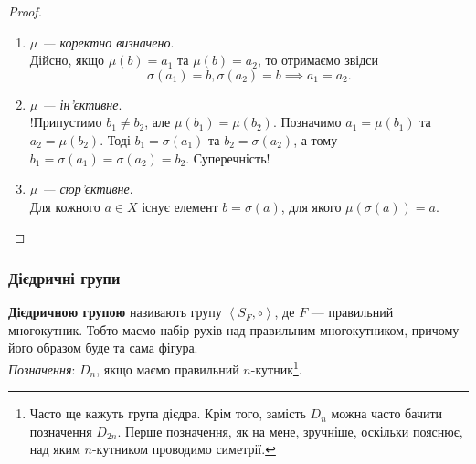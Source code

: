 \documentclass{math_library}
\begin{document}
\begin{proof}
\begin{enumerate}[topsep=0pt,label={\Roman*.},wide=0pt]
\item \textit{$\mu$ --- коректно визначено}.\\
Дійсно, якщо $\mu(b) = a_1$ та $\mu(b) = a_2$, то отримаємо звідси \[
\sigma(a_1) = b, \sigma(a_2) = b \implies a_1 = a_2.
\]

\item \textit{$\mu$ --- ін'єктивне}.\\
!Припустимо $b_1 \neq b_2$, але $\mu(b_1) = \mu(b_2)$. Позначимо $a_1 = \mu(b_1)$ та $a_2 = \mu(b_2)$. Тоді $b_1 = \sigma(a_1)$ та $b_2 = \sigma(a_2)$, а тому $b_1 = \sigma(a_1) = \sigma(a_2) = b_2$. Суперечність!

\item \textit{$\mu$ --- сюр'єктивне}.\\
Для кожного $a \in X$ існує елемент $b = \sigma(a)$, для якого $\mu(\sigma(a)) = a$. \qedhere
\end{enumerate}
\end{proof}

\subsubsection{Дієдричні групи}
\begin{definition}
\textbf{Дієдричною групою} називають групу $\left< S_{F}, \circ \right>$, де $F$ --- правильний многокутник. Тобто маємо набір рухів над правильним многокутником, причому його образом буде та сама фігура.\\
\textit{Позначення}: $D_n$, якщо маємо правильний $n$-кутник\footnote{Часто ще кажуть група дієдра. Крім того, замість $D_n$ можна часто бачити позначення $D_{2n}$. Перше позначення, як на мене, зручніше, оскільки пояснює, над яким $n$-кутником проводимо симетрії.}.
\end{definition}
\end{document}
